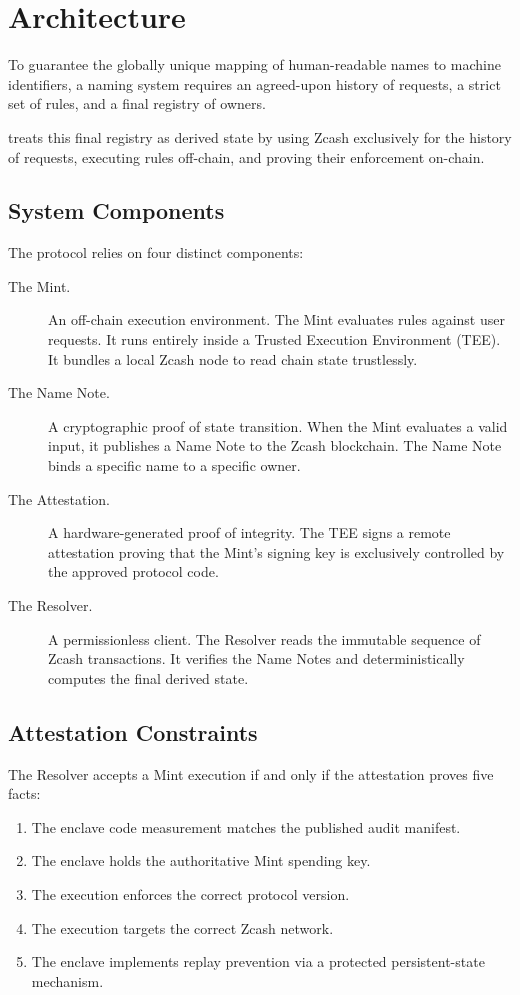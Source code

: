 \section{Architecture}
\label{sec:architecture}

To guarantee the globally unique mapping of human-readable names to machine identifiers, a naming system requires an agreed-upon history of requests, a strict set of rules, and a final registry of owners.

\zns{} treats this final registry as derived state by using Zcash exclusively for the history of requests, executing rules off-chain, and proving their enforcement on-chain.

\subsection{System Components}

The protocol relies on four distinct components:

\begin{description}
  \item[The Mint.] An off-chain execution environment. The Mint evaluates rules against user requests. It runs entirely inside a Trusted Execution Environment (TEE). It bundles a local Zcash node to read chain state trustlessly.
  \item[The Name Note.] A cryptographic proof of state transition. When the Mint evaluates a valid input, it publishes a Name Note to the Zcash blockchain. The Name Note binds a specific name to a specific owner.
  \item[The Attestation.] A hardware-generated proof of integrity. The TEE signs a remote attestation proving that the Mint's signing key is exclusively controlled by the approved protocol code.
  \item[The Resolver.] A permissionless client. The Resolver reads the immutable sequence of Zcash transactions. It verifies the Name Notes and deterministically computes the final derived state.
\end{description}

\subsection{Attestation Constraints}

The Resolver accepts a Mint execution if and only if the attestation proves five facts:

\begin{enumerate}
  \item The enclave code measurement matches the published audit manifest.
  \item The enclave holds the authoritative Mint spending key.
  \item The execution enforces the correct \zns{} protocol version.
  \item The execution targets the correct Zcash network.
  \item The enclave implements replay prevention via a protected persistent-state mechanism.
\end{enumerate}

